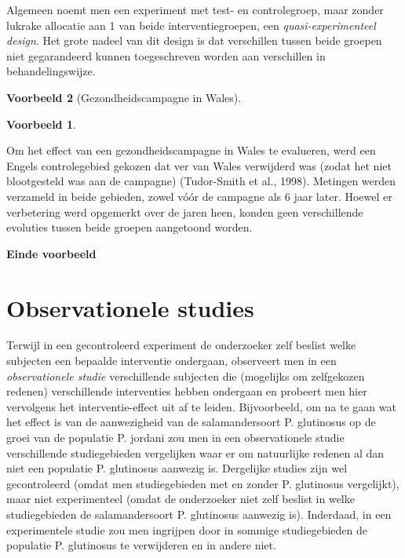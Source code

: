\documentclass[
  12pt,dutch,coursenotes]{book}
\theoremstyle{definition}
\theoremstyle{definition}
\newtheorem{example}{Voorbeeld}[chapter]
\theoremstyle{definition}
\theoremstyle{remark}
\begin{document}
Algemeen noemt men een experiment met test- en controlegroep, maar zonder
lukrake allocatie aan 1 van beide interventiegroepen, een \emph{quasi-experimenteel design}. Het grote nadeel van dit design is dat
verschillen tussen beide groepen niet gegarandeerd kunnen toegeschreven
worden aan verschillen in behandelingswijze.

\begin{example}[Gezondheidscampagne in Wales]
\begin{example}

\protect\hypertarget{exm:unnamed-chunk-81}{}{\label{exm:unnamed-chunk-81} \iffalse (Gezondheidscampagne in Wales) \fi{} }

\end{example}
\end{example}

Om het effect van een gezondheidscampagne in Wales te evalueren, werd
een Engels controlegebied gekozen dat ver van Wales verwijderd was (zodat
het niet blootgesteld was aan de campagne) (Tudor-Smith et al., 1998).
Metingen werden verzameld in beide gebieden, zowel vóór de campagne
als 6 jaar later. Hoewel er verbetering werd opgemerkt over de jaren heen,
konden geen verschillende evoluties tussen beide groepen aangetoond worden.

\textbf{Einde voorbeeld}

\hypertarget{sec:observational}{%
\section{Observationele studies}\label{sec:observational}}

Terwijl in een gecontroleerd experiment de onderzoeker zelf beslist
welke subjecten een bepaalde interventie ondergaan, observeert men
in een \emph{observationele studie} verschillende subjecten die (mogelijks om zelfgekozen redenen) verschillende interventies hebben ondergaan en probeert men hier vervolgens het interventie-effect uit af te leiden. Bijvoorbeeld, om na te gaan wat het effect is van de aanwezigheid van de salamandersoort P. glutinosus op de groei van de populatie P. jordani zou men in een observationele studie verschillende studiegebieden vergelijken waar er om natuurlijke redenen al dan niet een populatie P. glutinosus aanwezig is. Dergelijke studies
zijn wel gecontroleerd (omdat men studiegebieden met en zonder P. glutinosus vergelijkt), maar niet experimenteel (omdat de
onderzoeker niet zelf beslist in welke studiegebieden de salamandersoort P. glutinosus aanwezig is). Inderdaad, in een experimentele studie zou men ingrijpen door in sommige studiegebieden de populatie P. glutinosus te verwijderen en in andere niet.
\end{document}
